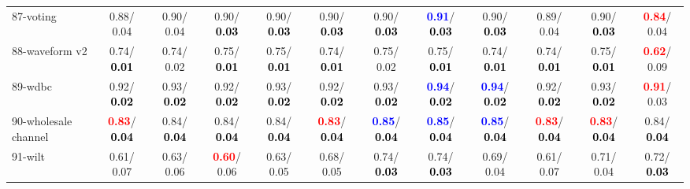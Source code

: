 \begin{table}[h]
\begin{center}
{\begin{tabular}{lc|c|c|c|c|c|c|c|c|c|c}
87-voting &   0.88/  0.04 &   0.90/  0.04 &   0.90/\textcolor{black}{\textbf{  0.03}} &   0.90/\textcolor{black}{\textbf{  0.03}} &   0.90/\textcolor{black}{\textbf{  0.03}} &   0.90/\textcolor{black}{\textbf{  0.03}} & \textcolor{blue}{\textbf{  0.91}}/\textcolor{black}{\textbf{  0.03}} &   0.90/\textcolor{black}{\textbf{  0.03}} &   0.89/  0.04 &   0.90/\textcolor{black}{\textbf{  0.03}} & \textcolor{red}{\textbf{  0.84}}/  0.04 \\
88-waveform v2 &   0.74/\textcolor{black}{\textbf{  0.01}} &   0.74/  0.02 &   0.75/\textcolor{black}{\textbf{  0.01}} &   0.75/\textcolor{black}{\textbf{  0.01}} &   0.74/\textcolor{black}{\textbf{  0.01}} &   0.75/  0.02 &   0.75/\textcolor{black}{\textbf{  0.01}} &   0.74/\textcolor{black}{\textbf{  0.01}} &   0.74/\textcolor{black}{\textbf{  0.01}} &   0.75/\textcolor{black}{\textbf{  0.01}} & \textcolor{red}{\textbf{  0.62}}/  0.09 \\
89-wdbc &   0.92/\textcolor{black}{\textbf{  0.02}} &   0.93/\textcolor{black}{\textbf{  0.02}} &   0.92/\textcolor{black}{\textbf{  0.02}} &   0.93/\textcolor{black}{\textbf{  0.02}} &   0.92/\textcolor{black}{\textbf{  0.02}} &   0.93/\textcolor{black}{\textbf{  0.02}} & \textcolor{blue}{\textbf{  0.94}}/\textcolor{black}{\textbf{  0.02}} & \textcolor{blue}{\textbf{  0.94}}/\textcolor{black}{\textbf{  0.02}} &   0.92/\textcolor{black}{\textbf{  0.02}} &   0.93/\textcolor{black}{\textbf{  0.02}} & \textcolor{red}{\textbf{  0.91}}/  0.03 \\
90-wholesale channel & \textcolor{red}{\textbf{  0.83}}/\textcolor{black}{\textbf{  0.04}} &   0.84/\textcolor{black}{\textbf{  0.04}} &   0.84/\textcolor{black}{\textbf{  0.04}} &   0.84/\textcolor{black}{\textbf{  0.04}} & \textcolor{red}{\textbf{  0.83}}/\textcolor{black}{\textbf{  0.04}} & \textcolor{blue}{\textbf{  0.85}}/\textcolor{black}{\textbf{  0.04}} & \textcolor{blue}{\textbf{  0.85}}/\textcolor{black}{\textbf{  0.04}} & \textcolor{blue}{\textbf{  0.85}}/\textcolor{black}{\textbf{  0.04}} & \textcolor{red}{\textbf{  0.83}}/\textcolor{black}{\textbf{  0.04}} & \textcolor{red}{\textbf{  0.83}}/\textcolor{black}{\textbf{  0.04}} &   0.84/\textcolor{black}{\textbf{  0.04}} \\
91-wilt &   0.61/  0.07 &   0.63/  0.06 & \textcolor{red}{\textbf{  0.60}}/  0.06 &   0.63/  0.05 &   0.68/  0.05 &   0.74/\textcolor{black}{\textbf{  0.03}} &   0.74/\textcolor{black}{\textbf{  0.03}} &   0.69/  0.04 &   0.61/  0.07 &   0.71/  0.04 &   0.72/\textcolor{black}{\textbf{  0.03}} \\

\end{tabular}}
\end{center}
\end{table}
